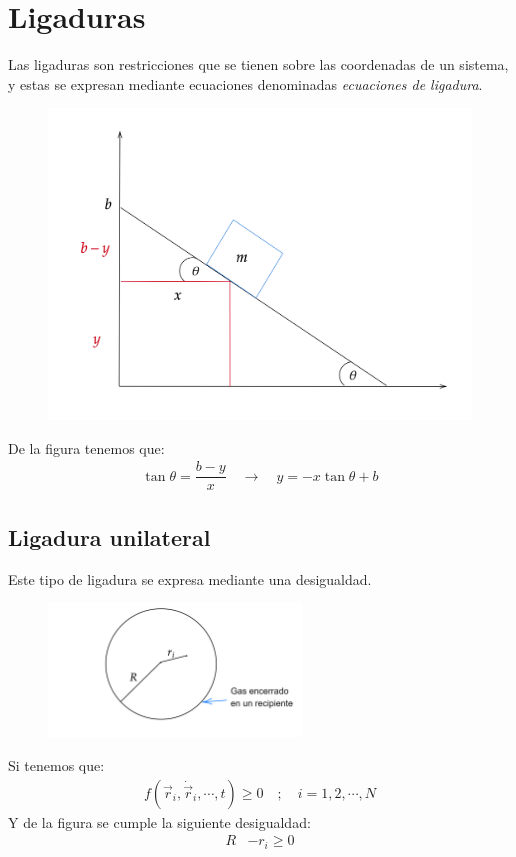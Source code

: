 \documentclass[../main]{subfiles}
\begin{document}
\section{Ligaduras}

Las ligaduras son restricciones que se tienen sobre las coordenadas de un sistema, y estas se expresan mediante ecuaciones denominadas \textit{ecuaciones de ligadura}.

    \begin{figure}[ht]
        \centering
        \includegraphics[scale=0.1]{../assets/images/lig1.png}
        \label{fig:fig2}
    \end{figure}
    De la figura tenemos que:
    \begin{align}
        \tan{\theta}=\dfrac{b-y}{x} \quad \rightarrow \quad y=-x \tan{\theta}+b \label{eq40}
    \end{align}
\subsection*{Ligadura unilateral} 
Este tipo de ligadura se expresa mediante una desigualdad.

    \begin{figure}[ht]
        \centering
        \includegraphics[width=0.6\textwidth]{../assets/images/lig2.png}
        \label{fig:fig3}
    \end{figure}
    Si tenemos que: 
    \begin{align}
        f(\vec{r}_i, \dot{\vec{r}}_i, \cdots, t) \geq 0 \quad ; \quad i=1,2,\cdots,N 
    \end{align}
    Y de la figura se cumple la siguiente desigualdad:
    \begin{align}
        R&-r_i \geq 0
    \end{align}
\end{document}
